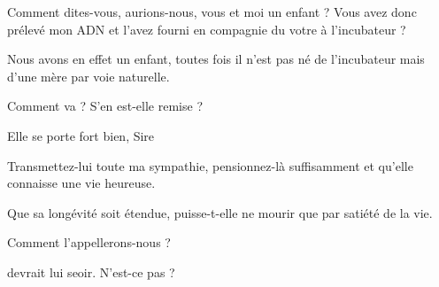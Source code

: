 \begin{drama}
  \elaspeaks Comment dites-vous, aurions-nous, vous et moi un enfant ? Vous avez donc prélevé mon ADN et l’avez fourni en compagnie du votre à l’incubateur ?

  \elenaspeaks Nous avons en effet un enfant, toutes fois il n’est pas né de l’incubateur mais d’une mère par voie naturelle.



  \elenaspeaks {} Comment va \catin ? S’en est-elle remise ?

  \alexasspeaks Elle se porte fort bien, Sire

  \elenaspeaks Transmettez-lui toute ma sympathie, pensionnez-là suffisamment et qu’elle connaisse une vie heureuse. 

  \alexasspeaks Que sa longévité soit étendue, puisse-t-elle ne mourir que par satiété de la vie.

  \elaspeaks Comment l’appellerons-nous ?

  \elenaspeaks \cleopatre devrait lui seoir. N’est-ce pas \cleopatre ?

\end{drama}

\scene

\StageDirII{\elena, \ela, \alexas, \cleopatre, \nobleOne, \nobleTwo, \nobleTree, \pretre, \huissier, \peuple, \darius, \dariussuite}


